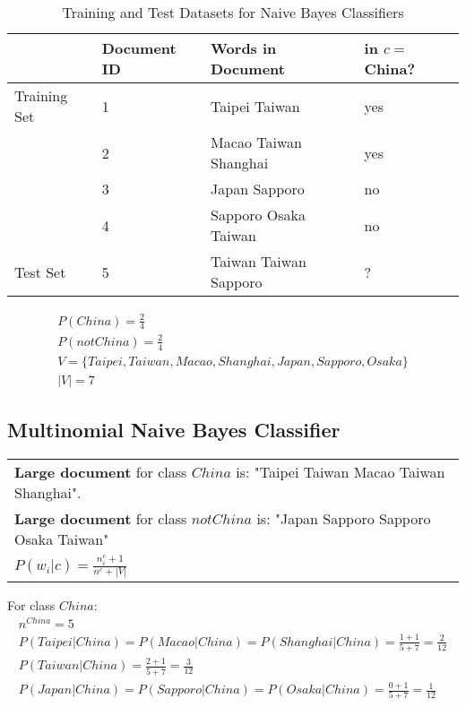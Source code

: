 \documentclass{article}
\begin{document}
\begin{table}[h]
	\centering
	\begin{tabular}{|l|l|l|l|}
	\hline
	& \textbf{Document ID} & \textbf{Words in Document} & \textbf{in $c=$China?} \\
	\hline
	Training Set & 1 & Taipei Taiwan & yes \\
	& 2 & Macao Taiwan Shanghai & yes \\
	& 3 & Japan Sapporo & no \\
	& 4 & Sapporo Osaka Taiwan & no \\
	\hline
	Test Set & 5 & Taiwan Taiwan Sapporo & ? \\
	\hline 
	\end{tabular}
	\caption{Training and Test Datasets for Naive Bayes Classifiers}
	\label{tab:example_problem}
\end{table}

\begin{align}
P(China) = \frac{2}{4} \\
P(notChina) = \frac{2}{4} \\
V = \lbrace Taipei, Taiwan, Macao, Shanghai, Japan, Sapporo, Osaka \rbrace \\
|V| = 7
\end{align}

\subsection{Multinomial Naive Bayes Classifier}

\begin{tabular}{l}
\textbf{Large document} for class $China$ is: "Taipei Taiwan Macao Taiwan Shanghai". \\
\textbf{Large document} for class $notChina$ is: "Japan Sapporo Sapporo Osaka Taiwan" \\
$P(w_i|c) = \frac{n_i^c + 1}{n^c + |V|}$
\end{tabular}

\hspace{2pt}

For class $China$:
\begin{align}
n^{China} = 5 \\
P(Taipei|China) = P(Macao|China) = P(Shanghai|China) = \frac{1 + 1}{5 + 7} = \frac{2}{12} \\
P(Taiwan|China) = \frac{2 + 1}{5 + 7} = \frac{3}{12} \\
P(Japan|China) = P(Sapporo|China) = P(Osaka|China) = \frac{0 + 1}{5 + 7} = \frac{1}{12}
\end{align}
\end{document}
